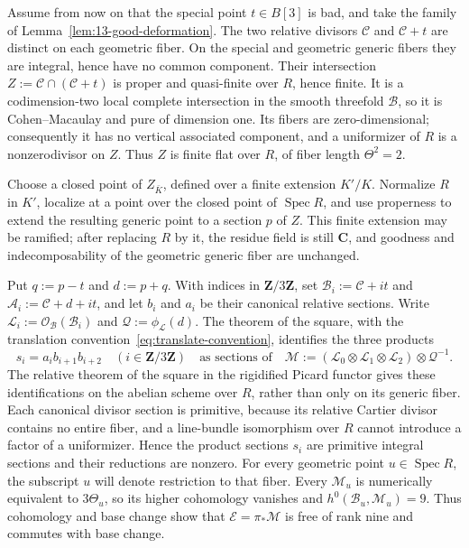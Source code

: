 \documentclass[12pt]{amsart}
\numberwithin{equation}{section}
\theoremstyle{definition}
\theoremstyle{remark}
\newcommand{\C}{\mathbf C}
\newcommand{\Z}{\mathbf Z}
\newcommand{\Spec}{\operatorname{Spec}}
\begin{document}
Assume from now on that the special point $t\in B[3]$ is bad, and take
the family of Lemma~\ref{lem:13-good-deformation}.  The two relative
divisors $\mathscr C$ and $\mathscr C+t$ are distinct on each geometric
fiber.  On the special and
geometric generic fibers they are integral, hence have no common
component.  Their intersection
$Z:=\mathscr C\cap(\mathscr C+t)$ is proper and quasi-finite over $R$,
hence finite.  It is a codimension-two local complete intersection in
the smooth threefold $\mathscr B$, so it is Cohen--Macaulay and pure of
dimension one.  Its fibers are zero-dimensional; consequently it has
no vertical associated component, and a uniformizer of $R$ is a
nonzerodivisor on $Z$.  Thus $Z$ is finite flat over $R$, of fiber
length $\Theta^2=2$.

Choose a closed point of $Z_{\bar K}$, defined over a finite extension
$K'/K$.  Normalize $R$ in $K'$, localize at a point over the closed
point of $\Spec R$, and use properness to extend the resulting generic
point to a section $p$ of $Z$.  This finite extension may be ramified;
after replacing $R$ by it, the residue field is still $\C$, and goodness
and indecomposability of the geometric generic fiber are unchanged.

Put $q:=p-t$ and $d:=p+q$.  With indices in $\Z/3\Z$, set
$\mathscr B_i:=\mathscr C+it$ and
$\mathscr A_i:=\mathscr C+d+it$, and let $b_i$ and $a_i$ be their
canonical relative sections.  Write
$\mathscr L_i:=\mathcal O_{\mathscr B}(\mathscr B_i)$ and
$\mathscr Q:=\phi_{\mathscr L}(d)$.  The theorem of the square, with the
translation convention~\eqref{eq:translate-convention}, identifies the
three products
\[
 s_i=a_i b_{i+1}b_{i+2}\quad(i\in\Z/3\Z)
 \quad\text{as sections of}\quad
 \mathscr M:=(\mathscr L_0\otimes\mathscr L_1\otimes\mathscr L_2)
 \otimes\mathscr Q^{-1}.
\]
The relative theorem of the square in the rigidified Picard functor
gives these identifications on the abelian scheme over $R$, rather than
only on its generic fiber.  Each canonical divisor section is primitive,
because its relative Cartier divisor contains no entire fiber, and a
line-bundle isomorphism over $R$ cannot introduce a factor of a
uniformizer.  Hence the product sections $s_i$ are primitive integral
sections and their reductions are nonzero.  For every geometric point
$u\in\Spec R$, the subscript $u$ will denote restriction to that fiber.
Every $\mathscr M_u$ is numerically equivalent to $3\Theta_u$, so its
higher cohomology vanishes and
$h^0(\mathscr B_u,\mathscr M_u)=9$.  Thus cohomology and base change show
that
$\mathscr E=\pi_*\mathscr M$ is free of rank nine and commutes with base
change.
\end{document}
